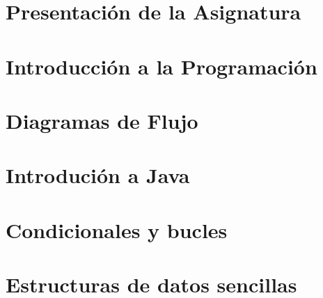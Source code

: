 \documentclass[12pt]{report} %
\begin{document}


\clearpage
{} %




\part{Presentación de la Asignatura}


\part{Introducción a la Programación}



\part{Diagramas de Flujo}



\part{Introdución a Java}



\part{Condicionales y bucles}



\part{Estructuras de datos sencillas}


\end{document}

